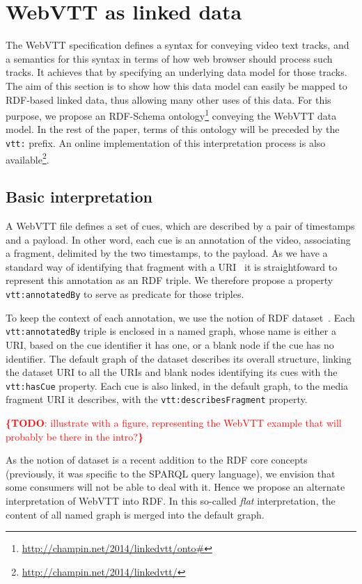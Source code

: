 \documentclass{sig-alternate}
\newcommand{\inlinelistingsize}{\fontsize{8pt}{11pt}}
\let\oldurl\url
\renewcommand{\url}[1]{\inlinelistingsize\oldurl{#1}}
\newcommand{\todo}[1]{\noindent\textcolor{red}{{\bf \{TODO}: #1{\bf \}}}}
\newcommand{\vtt}[1]{\texttt{vtt:#1}}
\begin{document}
\section{WebVTT as linked data}

The WebVTT specification defines a syntax for conveying video text tracks,
and a semantics for this syntax in terms of how web browser should process such tracks.
It achieves that by specifying an underlying data model for those tracks.
The aim of this section is to show
how this data model can easily be mapped to RDF-based linked data,
thus allowing many other uses of this data.
For this purpose, we propose an RDF-Schema ontology\footnote{
  \url{http://champin.net/2014/linkedvtt/onto\#}
} conveying the WebVTT data model.
In the rest of the paper, terms of this ontology will be preceded by the \vtt{} prefix.
An online implementation of this interpretation process is also available\footnote{
  \url{http://champin.net/2014/linkedvtt/}
}.

\subsection{Basic interpretation}

A WebVTT file defines a set of cues,
which are described by a pair of timestamps and a payload.
In other word, each cue is an annotation of the video,
associating a fragment, delimited by the two timestamps, to the payload.
As we have a standard way of identifying that fragment with a URI~\cite{troncy2012mediafragments}
it is straightfoward to represent this annotation as an RDF triple.
We therefore propose a property \vtt{annotatedBy} to serve as predicate for those triples.

To keep the context of each annotation,
we use the notion of RDF dataset~\cite{cyganiak2014rdf11concepts}.
Each \vtt{annotatedBy} triple is enclosed in a named graph,
whose name is either a URI, based on the cue identifier it has one,
or a blank node if the cue has no identifier.
The default graph of the dataset describes its overall structure,
linking the dataset URI to all the URIs and blank nodes identifying its cues
with the \vtt{hasCue} property.
Each cue is also linked, in the default graph, to the media fragment URI it describes,
with the \vtt{describesFragment} property. 

\todo{illustrate with a figure, representing the WebVTT example that will probably be there in the intro?}

As the notion of dataset is a recent addition to the RDF core concepts
(previously, it was specific to the SPARQL query language),
we envision that some consumers will not be able to deal with it.
Hence we propose an alternate interpretation of WebVTT into RDF.
In this so-called \emph{flat} interpretation,
the content of all named graph is merged into the default graph.
\end{document}

